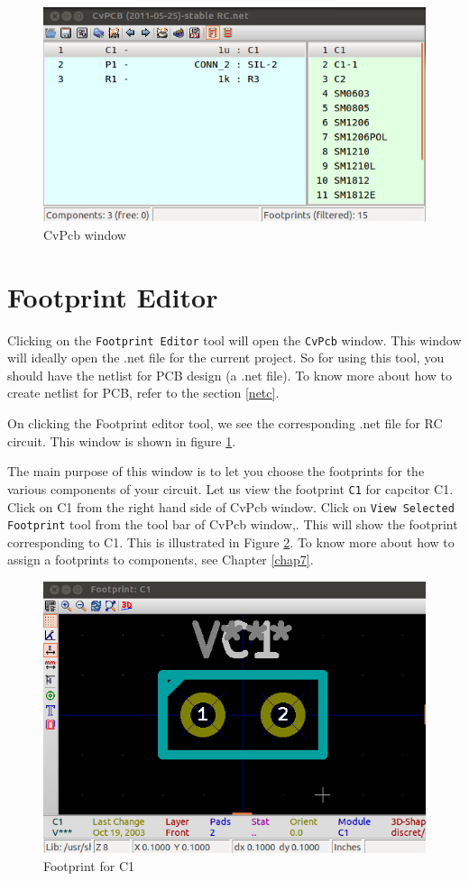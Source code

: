 \begin{figure}
\begin{center}
\includegraphics[width=0.8\linewidth]{figures/CvPCB-window.png}
\caption{CvPcb window}
\label{CvPcb-window}
\end{center}
\end{figure}

\section{Footprint Editor}
Clicking on the {\tt Footprint Editor} tool will open the {\tt CvPcb} window. This window will ideally open the .net file for the current project. So for using this tool, you should have the netlist for PCB design (a .net file). To know more about how to create netlist for PCB, refer to the section \ref{netc}.

On clicking the Footprint editor tool, we see the corresponding .net file for RC circuit. This window is shown in figure \ref{CvPcb-window}. 

The main purpose of this window is to let you choose the footprints for the various components of your circuit. Let us view the footprint {\tt C1} for capcitor C1. Click on C1 from the right hand side of CvPcb window. Click on {\tt View Selected Footprint} tool from the tool bar of CvPcb window,. This will show the footprint corresponding to C1. This is illustrated in Figure \ref{footprint-c1}. To know more about how to assign a footprints to components, see Chapter \ref{chap7}.

\begin{figure}
\begin{center}
\includegraphics[width=0.8\linewidth]{figures/footprint-c1.png}
\caption{Footprint for C1}
\label{footprint-c1}
\end{center}
\end{figure}

